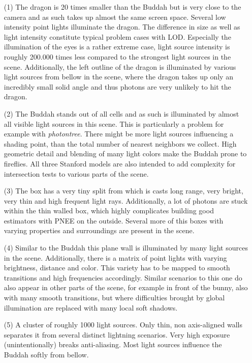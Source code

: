 \begin{itemize}
    \item[(1)] The dragon is 20 times smaller than the Buddah but is very close to the camera and as such takes up almost the same screen space. Several low intensity point lights illuminate the dragon. The difference in size as well as light intensity constitute typical problem cases with LOD. Especially the illumination of the eyes is a rather extreme case, light source intensity is roughly 200.000 times less compared to the strongest light sources in the scene. Additionally, the left outline of the dragon is illuminated by various light sources from bellow in the scene, where the dragon takes up only an incredibly small solid angle and thus photons are very unlikely to hit the dragon.
    \item[(2)] The Buddah stands out of all cells and as such is illuminated by almost all visible light sources in this scene. This is particularly a problem for example with \textit{photontree}. There might be more light sources influencing a shading point, than the total number of nearest neighbors we collect. High geometric detail and blending of many light colors make the Buddah prone to fireflies.  All three Stanford models are also intended to add complexity for intersection tests to various parts of the scene. 
    \item[(3)] The box has a very tiny split from which is casts long range, very bright, very thin and high frequent light rays. Additionally, a lot of photons are stuck within the thin walled box, which highly complicates building good estimators with PNEE on the outside. Several more of this boxes with varying properties and surroundings are present in the scene. 
    \item[(4)] Similar to the Buddah this plane wall is illuminated by many light sources in the scene. Additionally, there is a matrix of point lights with varying brightness, distance and color. This variety has to be mapped to smooth transitions and high frequencies accordingly. Similar scenarios to this one do also appear in other parts of the scene, for example in front of the bunny, also with many smooth transitions, but where difficulties brought by global illumination are replaced with many local soft shadows. 
    \item[(5)] A cluster of roughly 1000 light sources. Only thin, non axis-aligned walls separates it from several distinct lightning scenarios. Very high exposure (unintentionally) breaks anti-aliasing. Most light sources influence the Buddah softly from bellow. 

\end{itemize}
